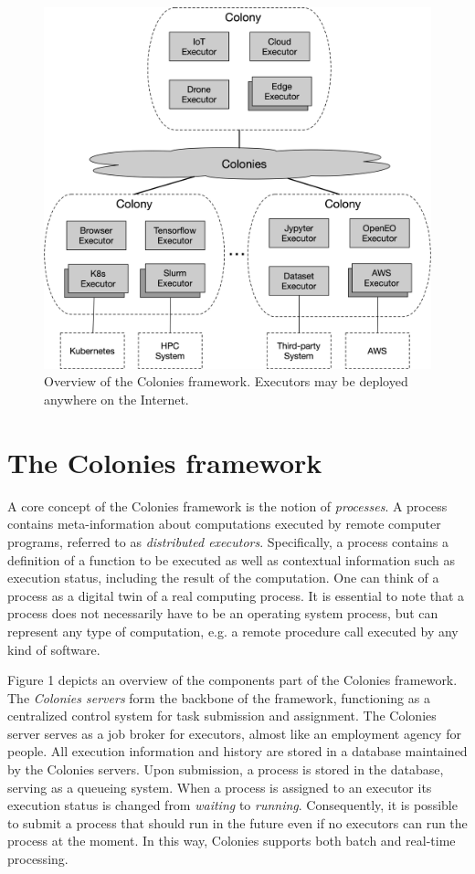 \documentclass{article}
\begin{document}
\begin{figure}[t]
	\centering
    \includegraphics[scale=0.45]{overview.png}
	\caption{Overview of the Colonies framework. Executors may be deployed anywhere on the Internet.}
	\label{fig:overview}
\end{figure}

\section{The Colonies framework}
\label{sec:headings}
A core concept of the Colonies framework is the notion of \emph{processes}. A process contains meta-information about computations executed by remote computer programs, referred to as \emph{distributed executors}. Specifically, a process contains a definition of a function to be executed as well as contextual information such as execution status, including the result of the computation. One can think of a process as a digital twin of a real computing process. It is essential to note that a process does not necessarily have to be an operating system process, but can represent any type of computation, e.g. a remote procedure call executed by any kind of software. 

Figure 1 depicts an overview of the components part of the Colonies framework. The \emph{Colonies servers} form the backbone of the framework, functioning as a centralized control system for task submission and assignment. The Colonies server serves as a job broker for executors, almost like an employment agency for people. All execution information and history are stored in a database maintained by the Colonies servers. Upon submission, a process is stored in the database, serving as a queueing system. When a process is assigned to an executor its execution status is changed from \emph{waiting} to \emph{running}. Consequently, it is possible to submit a process that should run in the future even if no executors can run the process at the moment. In this way, Colonies supports both batch and real-time processing. 
\end{document}
